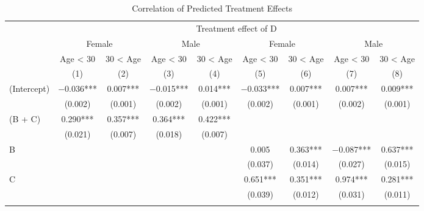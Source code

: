 \documentclass[
  lualatex,
  11pt,
  a4paper
]{article}
\begin{document}
\begin{table}

\caption{\label{tab:rcf-int-corr}Correlation of Predicted Treatment Effects}
\centering
\fontsize{9}{11}\selectfont
\begin{threeparttable}
\begin{tabular}[t]{lcccccccc}
\toprule
\multicolumn{1}{c}{ } & \multicolumn{8}{c}{Treatment effect of D} \\
\cmidrule(l{3pt}r{3pt}){2-9}
\multicolumn{1}{c}{ } & \multicolumn{2}{c}{Female} & \multicolumn{2}{c}{Male} & \multicolumn{2}{c}{Female} & \multicolumn{2}{c}{Male} \\
\cmidrule(l{3pt}r{3pt}){2-3} \cmidrule(l{3pt}r{3pt}){4-5} \cmidrule(l{3pt}r{3pt}){6-7} \cmidrule(l{3pt}r{3pt}){8-9}
\multicolumn{1}{c}{ } & \multicolumn{1}{c}{Age < 30} & \multicolumn{1}{c}{30 < Age} & \multicolumn{1}{c}{Age < 30} & \multicolumn{1}{c}{30 < Age} & \multicolumn{1}{c}{Age < 30} & \multicolumn{1}{c}{30 < Age} & \multicolumn{1}{c}{Age < 30} & \multicolumn{1}{c}{30 < Age} \\
\cmidrule(l{3pt}r{3pt}){2-2} \cmidrule(l{3pt}r{3pt}){3-3} \cmidrule(l{3pt}r{3pt}){4-4} \cmidrule(l{3pt}r{3pt}){5-5} \cmidrule(l{3pt}r{3pt}){6-6} \cmidrule(l{3pt}r{3pt}){7-7} \cmidrule(l{3pt}r{3pt}){8-8} \cmidrule(l{3pt}r{3pt}){9-9}
  & (1) & (2) & (3) & (4) & (5) & (6) & (7) & (8)\\
\midrule
(Intercept) & \num{-0.036}*** & \num{0.007}*** & \num{-0.015}*** & \num{0.014}*** & \num{-0.033}*** & \num{0.007}*** & \num{0.007}*** & \num{0.009}***\\
 & (\num{0.002}) & (\num{0.001}) & (\num{0.002}) & (\num{0.001}) & (\num{0.002}) & (\num{0.001}) & (\num{0.002}) & (\num{0.001})\\
(B + C) & \num{0.290}*** & \num{0.357}*** & \num{0.364}*** & \num{0.422}*** &  &  &  & \\
 & (\num{0.021}) & (\num{0.007}) & (\num{0.018}) & (\num{0.007}) &  &  &  \vphantom{1} & \\
B &  &  &  &  & \num{0.005} & \num{0.363}*** & \num{-0.087}*** & \num{0.637}***\\
 &  &  &  &  & (\num{0.037}) & (\num{0.014}) & (\num{0.027}) & (\num{0.015})\\
C &  &  &  &  & \num{0.651}*** & \num{0.351}*** & \num{0.974}*** & \num{0.281}***\\
 &  &  &  &  & (\num{0.039}) & (\num{0.012}) & (\num{0.031}) & (\num{0.011})\\
\addlinespace[0.3em]
\multicolumn{9}{l}{\textit{Linear combination test (F-test)}}\\

\end{tabular}
\end{threeparttable}
\end{table}
\end{document}
